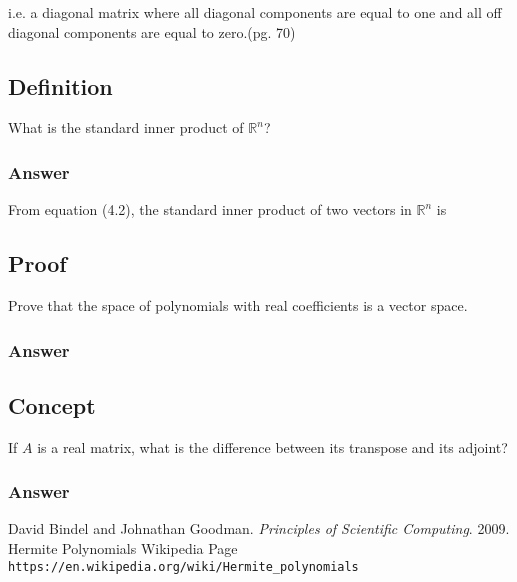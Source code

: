 \documentclass{article}
\begin{document}
		i.e. a diagonal matrix where all diagonal components are equal to one and all off diagonal components are equal to zero.\cite{BG}(pg. 70)
		\subsection{Definition}
		What is the standard inner product of $\mathbb{R}^{n}$?
		
		\subsubsection{Answer}
		From equation (4.2)\cite{BG}, the standard inner product of two vectors in $\mathbb{R}^{n}$ is 
		
		
		\subsection{Proof}
		Prove that the space of polynomials with real coefficients is a vector space.
		
		\subsubsection{Answer}
		
		\subsection{Concept}
		If $A$ is a real matrix, what is the difference between its transpose and its adjoint?
		
		\subsubsection{Answer}
		
		
\begin{thebibliography}{2}
	David Bindel and Johnathan Goodman.
	\textit{Principles of Scientific Computing}. 
	2009.
	Hermite Polynomials Wikipedia Page
	\\\texttt{https://en.wikipedia.org/wiki/Hermite\_polynomials}
\end{thebibliography}
\end{document}

